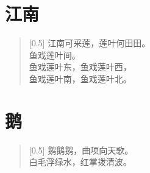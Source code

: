 \documentclass[12pt,UTF-8,openany]{ctexbook}
\begin{document}
\chapter{江南}

\begin{large}
    
    \begin{verse}[0.5\linewidth]
        江南可采莲，莲叶何田田。 \\
        鱼戏莲叶间。 \\
        鱼戏莲叶东，鱼戏莲叶西， \\
        鱼戏莲叶南，鱼戏莲叶北。
    \end{verse}
    
\end{large}


\clearpage

\begin{center}
    
\end{center}


\hanzibox{}\hanzibox{}\hanzibox{}\hanzibox{}\hspace{1em}\hanzibox{}\hanzibox{}\hanzibox{}\hanzibox{}

\hanzibox{}\hanzibox{}\hanzibox{}\hanzibox{}\hspace{1em}\hanzibox{}\hanzibox{}\hanzibox{}\hanzibox{}

\hanzibox{}\hanzibox{}\hanzibox{}\hanzibox{}\hspace{1em}\hanzibox{}\hanzibox{}\hanzibox{}\hanzibox{}






\chapter{鹅}

\begin{large}
    
    \begin{verse}[0.5\linewidth]
        \phantom{鹅}鹅鹅鹅\phantom{鹅}，曲项向天歌。 \\
        白毛浮绿水，红掌拨清波。
    \end{verse}
    
\end{large}


\clearpage
\end{document}
